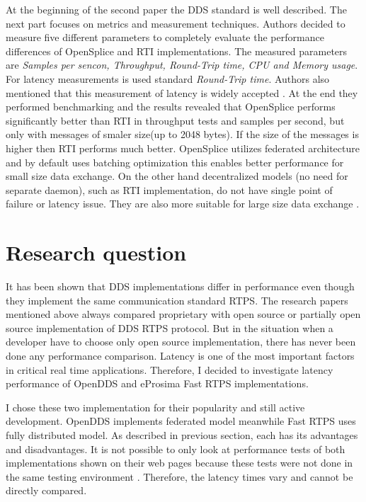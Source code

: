 \documentclass{csfourzero}
\begin{document}
At the beginning of the second paper the DDS standard is well described. The next part focuses on metrics and measurement techniques. Authors decided to measure five different parameters to completely evaluate the performance differences of OpenSplice and RTI implementations. The measured parameters are \textit{Samples per sencon, Throughput, Round-Trip time, CPU and Memory usage}. For latency measurements is used standard \textit{Round-Trip time}. Authors also mentioned that this measurement of latency is widely accepted \cite{perf-embedded}. At the end they performed benchmarking and the results revealed that OpenSplice performs significantly better than RTI in throughput tests and samples per second, but only with messages of smaler size(up to 2048 bytes). If the size of the messages is higher then RTI performs much better. OpenSplice utilizes federated architecture \cite{federated-arch} and by default uses batching optimization this enables better performance for small size data exchange. On the other hand decentralized models (no need for separate daemon), such as RTI implementation, do not have single point of failure or latency issue. They are also more suitable for large size data exchange \cite{splice-vs-rti}.

\section{Research question}
\label{sec:rq}

\quad It has been shown that DDS implementations differ in performance even though they implement the same communication standard RTPS. The research papers mentioned above always compared proprietary with open source or partially open source implementation of DDS RTPS protocol. But in the situation when a developer have to choose only open source implementation, there has never been done any performance comparison. Latency is one of the most important factors in critical real time applications. Therefore, I decided to investigate latency performance of OpenDDS \cite{git-openDDS} and eProsima Fast RTPS \cite{git-eProsima} implementations. 

I chose these two implementation for their popularity and still active development. OpenDDS implements federated model meanwhile Fast RTPS uses fully distributed model. As described in previous section, each has its advantages and disadvantages. It is not possible to only look at performance tests of both implementations shown on their web pages because these tests were not done in the same testing environment \cite{eProsima-perf, openDDS-perf}. Therefore, the latency times vary and cannot be directly compared.
\end{document}
